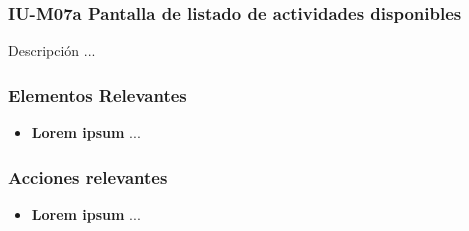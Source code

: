 
\subsubsection{IU-M07a Pantalla de listado de actividades disponibles}

 Descripción ...


\subsubsection{Elementos Relevantes}

    \begin{itemize}
    \item {\bf Lorem ipsum}
        ...
    \end{itemize}

\subsubsection{Acciones relevantes}

    \begin{itemize}
    \item {\bf Lorem ipsum}
        ...
    \end{itemize}

\clearpage
